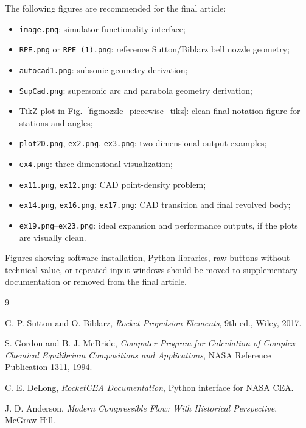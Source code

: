 \documentclass[11pt,a4paper]{article}
\begin{document}
The following figures are recommended for the final article:
\begin{itemize}
    \item \texttt{image.png}: simulator functionality interface;
    \item \texttt{RPE.png} or \texttt{RPE (1).png}: reference Sutton/Biblarz bell nozzle geometry;
    \item \texttt{autocad1.png}: subsonic geometry derivation;
    \item \texttt{SupCad.png}: supersonic arc and parabola geometry derivation;
    \item TikZ plot in Fig.~\ref{fig:nozzle_piecewise_tikz}: clean final notation figure for stations and angles;
    \item \texttt{plot2D.png}, \texttt{ex2.png}, \texttt{ex3.png}: two-dimensional output examples;
    \item \texttt{ex4.png}: three-dimensional visualization;
    \item \texttt{ex11.png}, \texttt{ex12.png}: CAD point-density problem;
    \item \texttt{ex14.png}, \texttt{ex16.png}, \texttt{ex17.png}: CAD transition and final revolved body;
    \item \texttt{ex19.png}--\texttt{ex23.png}: ideal expansion and performance outputs, if the plots are visually clean.
\end{itemize}

Figures showing software installation, Python libraries, raw buttons without technical value, or repeated input windows should be moved to supplementary documentation or removed from the final article.

\begin{thebibliography}{9}

G. P. Sutton and O. Biblarz, \textit{Rocket Propulsion Elements}, 9th ed., Wiley, 2017.

S. Gordon and B. J. McBride, \textit{Computer Program for Calculation of Complex Chemical Equilibrium Compositions and Applications}, NASA Reference Publication 1311, 1994.

C. E. DeLong, \textit{RocketCEA Documentation}, Python interface for NASA CEA.

J. D. Anderson, \textit{Modern Compressible Flow: With Historical Perspective}, McGraw-Hill.

\end{thebibliography}
\end{document}
